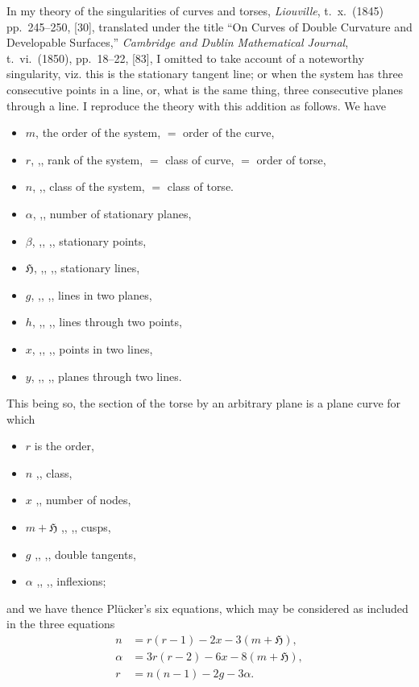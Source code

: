 \documentclass[11pt]{article}
\begin{document}
In my theory of the singularities of curves and torses, \emph{Liouville}, t.~x.~(1845) pp.~245--250, [30], translated under the title ``On Curves of Double Curvature and Developable Surfaces,'' \emph{Cambridge and Dublin Mathematical Journal}, t.~vi.~(1850), pp.~18--22, [83], I omitted to take account of a noteworthy singularity, viz. this is the stationary tangent line; or when the system has three consecutive points in a line, or, what is the same thing, three consecutive planes through a line. I reproduce the theory with this addition as follows. We have
\begin{itemize}\setlength{\itemsep}{0pt}
\item[] $m$, the order of the system, $=$ order of the curve,
\item[] $r$, ,, rank of the system, $=$ class of curve, $=$ order of torse,
\item[] $n$, ,, class of the system, $=$ class of torse.
\item[] $\alpha$, ,, number of stationary planes,
\item[] $\beta$, ,, ,, stationary points,
\item[] $\mathfrak{H}$, ,, ,, stationary lines,
\item[] $g$, ,, ,, lines in two planes,
\item[] $h$, ,, ,, lines through two points,
\item[] $x$, ,, ,, points in two lines,
\item[] $y$, ,, ,, planes through two lines.
\end{itemize}
This being so, the section of the torse by an arbitrary plane is a plane curve for which
\begin{itemize}\setlength{\itemsep}{0pt}
\item[] $r$ is the order,
\item[] $n$ ,, class,
\item[] $x$ ,, number of nodes,
\item[] $m + \mathfrak{H}$ ,, ,, cusps,
\item[] $g$ ,, ,, double tangents,
\item[] $\alpha$ ,, ,, inflexions;
\end{itemize}
and we have thence Pl\"ucker's six equations, which may be considered as included in the three equations
\begin{align*}
n &= r(r - 1) - 2x - 3(m + \mathfrak{H}),\\
\alpha &= 3r(r - 2) - 6x - 8(m + \mathfrak{H}),\\
r &= n(n - 1) - 2g - 3\alpha.
\end{align*}
\end{document}
